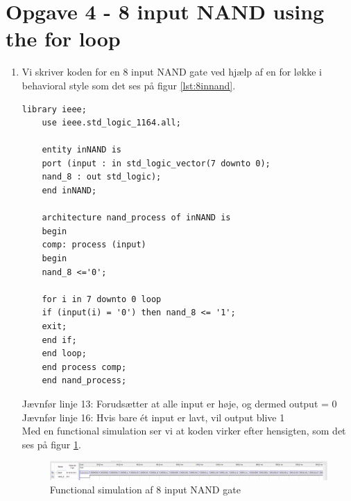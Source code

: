 \section{Opgave 4 - 8 input NAND using the for loop}
\begin{enumerate}
	\item[1)]
	Vi skriver koden for en 8 input NAND gate ved hjælp af en for løkke i behavioral style som det ses på figur \ref{lst:8innand}.\\
	\begin{lstlisting}[caption={Behavioral style kode for en 8 input NAND gate},label={lst:8innand}]
	library ieee;
	use ieee.std_logic_1164.all;
	
	entity inNAND is
	port (input : in std_logic_vector(7 downto 0);
	nand_8 : out std_logic);
	end inNAND;
	
	architecture nand_process of inNAND is
	begin
	comp: process (input)
	begin
	nand_8 <='0';
	
	for i in 7 downto 0 loop
	if (input(i) = '0') then nand_8 <= '1'; 
	exit;
	end if;
	end loop;
	end process comp;
	end nand_process;
	\end{lstlisting}
	Jævnfør linje 13: Forudsætter at alle input er høje, og dermed output = 0\\
	Jævnfør linje 16: Hvis bare ét input er lavt, vil output blive 1\\

	Med en functional simulation ser vi at koden virker efter hensigten, som det ses på figur \ref{fig:8innand}.\\
	\begin{figure}[h]
		\centering
		\includegraphics[scale=0.4]{pictures/Oevelse5/opg4/func_sim_8nand.JPG}
		\caption{Functional simulation af 8 input NAND gate}
		\label{fig:8innand}
	\end{figure}
\end{enumerate}
\clearpage